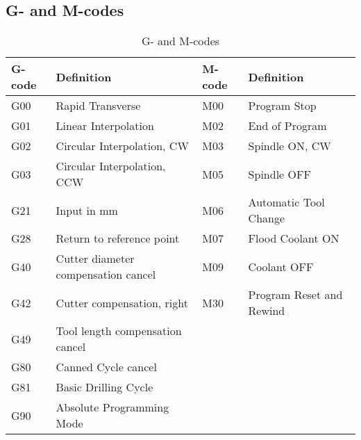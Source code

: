 \section*{}
\appendix
{}
\subsection{G- and M-codes}
\begin{table}[!h]
	\caption[G- and M-Codes]{G- and M-codes}
	
	\begin{center}
		\centering
		\begin{tabular}{|l|l|l|l|}
			\hline
			\textbf{G-code} & \textbf{Definition} &\textbf{ M-code} & \textbf{Definition}\\
			\hline
			
			G00 & Rapid Transverse & M00 & Program Stop\\
			G01 & Linear Interpolation &  M02 & End of Program \\
			G02 & Circular Interpolation, CW & M03 & Spindle ON, CW \\
			G03 & Circular Interpolation, CCW& M05 & Spindle OFF \\
			G21 & Input in mm & M06 & Automatic Tool Change\\
			G28 & Return to reference point & M07 & Flood Coolant ON \\
			G40 & Cutter diameter compensation cancel&M09 & Coolant OFF\\
			G42 & Cutter compensation, right &  M30 & Program Reset and Rewind\\
			G49 & Tool length compensation cancel &&\\
			G80 & Canned Cycle cancel&&\\
			G81 & Basic Drilling Cycle&&\\
			G90 & Absolute Programming Mode&&\\
			\hline
		\end{tabular}
	\end{center}
\end{table}
